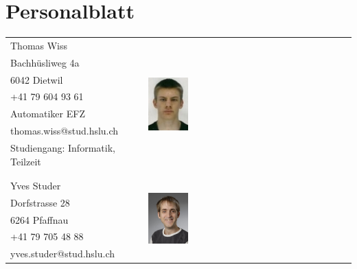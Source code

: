 
\section{Personalblatt}
  \begin{tabular}{lp{3.3cm}l}
    Thomas Wiss                                 & &  \multirow{8}{4cm}{\includegraphics[width=0.2\textwidth]{Sourcen/DasTeam/Bilder/ThomasWiss.jpg}} \\
    Bachhüsliweg 4a                             & &  \\
    6042 Dietwil                                & &  \\
    +41 79 604 93 61                            & &  \\
    Automatiker EFZ                             & &  \\
    thomas.wiss@stud.hslu.ch                 	& &  \\
    Studiengang: Informatik, Teilzeit           & &  \\
                                                & &  \\
                                                & &  \\
    Yves Studer                                 & &  \multirow{8}{4cm}{\includegraphics[width=0.2\textwidth]{Sourcen/DasTeam/Bilder/YvesStuder.jpg}} \\
    Dorfstrasse 28                              & &  \\
    6264 Pfaffnau                               & &  \\
    +41 79 705 48 88                            & &  \\
    yves.studer@stud.hslu.ch                    & &  \\

\end{tabular}
